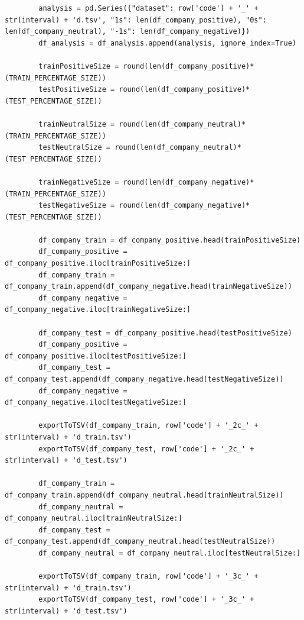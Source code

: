 \documentclass[grad,numbers]{coppe}
\begin{document}
\begin{verbatim}
        analysis = pd.Series({"dataset": row['code'] + '_' + str(interval) + 'd.tsv', "1s": len(df_company_positive), "0s": len(df_company_neutral), "-1s": len(df_company_negative)})
        df_analysis = df_analysis.append(analysis, ignore_index=True)
        
        trainPositiveSize = round(len(df_company_positive)*(TRAIN_PERCENTAGE_SIZE))
        testPositiveSize = round(len(df_company_positive)*(TEST_PERCENTAGE_SIZE))

        trainNeutralSize = round(len(df_company_neutral)*(TRAIN_PERCENTAGE_SIZE))
        testNeutralSize = round(len(df_company_neutral)*(TEST_PERCENTAGE_SIZE))

        trainNegativeSize = round(len(df_company_negative)*(TRAIN_PERCENTAGE_SIZE))
        testNegativeSize = round(len(df_company_negative)*(TEST_PERCENTAGE_SIZE))
        
        df_company_train = df_company_positive.head(trainPositiveSize)
        df_company_positive = df_company_positive.iloc[trainPositiveSize:]
        df_company_train = df_company_train.append(df_company_negative.head(trainNegativeSize))
        df_company_negative = df_company_negative.iloc[trainNegativeSize:]

        df_company_test = df_company_positive.head(testPositiveSize)
        df_company_positive = df_company_positive.iloc[testPositiveSize:]
        df_company_test = df_company_test.append(df_company_negative.head(testNegativeSize))
        df_company_negative = df_company_negative.iloc[testNegativeSize:]

        exportToTSV(df_company_train, row['code'] + '_2c_' + str(interval) + 'd_train.tsv')
        exportToTSV(df_company_test, row['code'] + '_2c_' + str(interval) + 'd_test.tsv')

        df_company_train = df_company_train.append(df_company_neutral.head(trainNeutralSize))
        df_company_neutral = df_company_neutral.iloc[trainNeutralSize:]
        df_company_test = df_company_test.append(df_company_neutral.head(testNeutralSize))
        df_company_neutral = df_company_neutral.iloc[testNeutralSize:]
        
        exportToTSV(df_company_train, row['code'] + '_3c_' + str(interval) + 'd_train.tsv')
        exportToTSV(df_company_test, row['code'] + '_3c_' + str(interval) + 'd_test.tsv')
			\end{verbatim}
\end{document}
